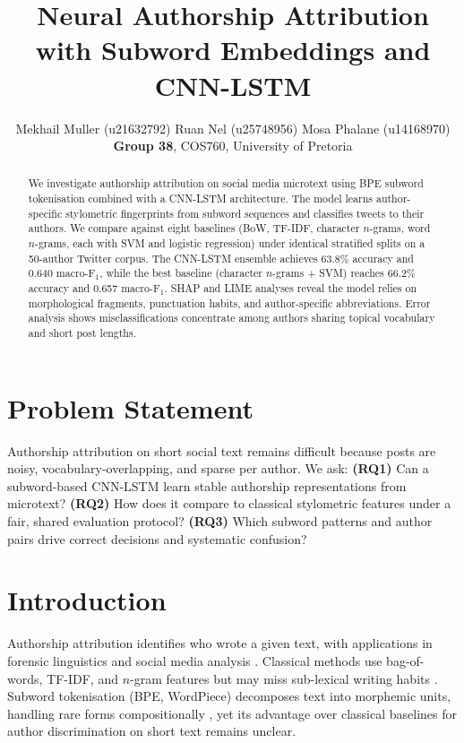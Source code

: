 \documentclass[11pt]{article}
\title{Neural Authorship Attribution with Subword Embeddings and CNN-LSTM}
\author{Mekhail Muller (u21632792) \And Ruan Nel (u25748956) \And Mosa Phalane (u14168970) \\
  \textbf{Group 38}, COS760, University of Pretoria}
\begin{document}
\maketitle

\begin{abstract}
We investigate authorship attribution on social media microtext using BPE subword tokenisation combined with a CNN-LSTM architecture. The model learns author-specific stylometric fingerprints from subword sequences and classifies tweets to their authors. We compare against eight baselines (BoW, TF-IDF, character $n$-grams, word $n$-grams, each with SVM and logistic regression) under identical stratified splits on a 50-author Twitter corpus. The CNN-LSTM ensemble achieves 63.8\% accuracy and 0.640 macro-F$_1$, while the best baseline (character $n$-grams + SVM) reaches 66.2\% accuracy and 0.657 macro-F$_1$. SHAP and LIME analyses reveal the model relies on morphological fragments, punctuation habits, and author-specific abbreviations. Error analysis shows misclassifications concentrate among authors sharing topical vocabulary and short post lengths.
\end{abstract}

\section{Problem Statement}
\label{sec:problem}

Authorship attribution on short social text remains difficult because posts are noisy, vocabulary-overlapping, and sparse per author. We ask: \textbf{(RQ1)} Can a subword-based CNN-LSTM learn stable authorship representations from microtext? \textbf{(RQ2)} How does it compare to classical stylometric features under a fair, shared evaluation protocol? \textbf{(RQ3)} Which subword patterns and author pairs drive correct decisions and systematic confusion?

\section{Introduction}
\label{sec:intro}

Authorship attribution identifies who wrote a given text, with applications in forensic linguistics and social media analysis \citep{theophilo2021authorship}. Classical methods use bag-of-words, TF-IDF, and $n$-gram features but may miss sub-lexical writing habits \citep{suman2021authorship,modupe2022applied}. Subword tokenisation (BPE, WordPiece) decomposes text into morphemic units, handling rare forms compositionally \citep{sennrich2016neural}, yet its advantage over classical baselines for author discrimination on short text remains unclear.
\end{document}
